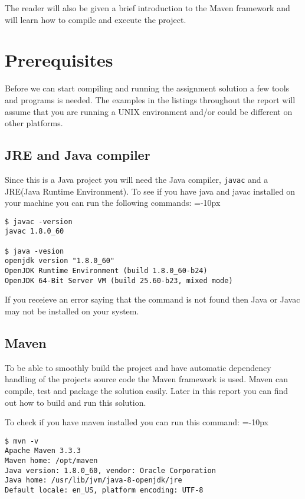 \documentclass[a4paper, 12pt]{article}
\begin{document}
The reader will also be given a brief introduction to the Maven framework and will learn how to compile and execute the project.

\section*{Prerequisites}
Before we can start compiling and running the assignment solution a few tools and programs is needed. The examples in the listings throughout the report will assume that you are running a UNIX environment and/or could be different on other platforms.

\subsection*{JRE and Java compiler}
Since this is a Java project you will need the Java compiler, \verb|javac| and a JRE(Java Runtime Environment). To see if you have java and javac installed on your machine you can run the following commands:
\belowcaptionskip=-10px
\begin{lstlisting}[label=cd-example, caption=Javac and JRE]
$ javac -version
javac 1.8.0_60

$ java -vesion
openjdk version "1.8.0_60"
OpenJDK Runtime Environment (build 1.8.0_60-b24)
OpenJDK 64-Bit Server VM (build 25.60-b23, mixed mode)

\end{lstlisting}
If you receieve an error saying that the command is not found then Java or Javac may not be installed on your system.

\subsection*{Maven}
To be able to smoothly build the project and have automatic dependency handling of the projects source code the Maven framework is used. Maven can compile, test and package the solution easily. Later in this report you can find out how to build and run this solution.

To check if you have maven installed you can run this command:
\belowcaptionskip=-10px
\begin{lstlisting}[label=cd-example, caption=Maven]
$ mvn -v
Apache Maven 3.3.3
Maven home: /opt/maven
Java version: 1.8.0_60, vendor: Oracle Corporation
Java home: /usr/lib/jvm/java-8-openjdk/jre
Default locale: en_US, platform encoding: UTF-8
\end{lstlisting}
\end{document}

